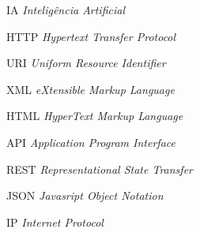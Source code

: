 \begin{siglas}
    \item[IA]{\textit{Inteligência Artificial}}

    \item[HTTP]{\textit{Hypertext Transfer Protocol}}

    \item[URI]{\textit{Uniform Resource Identifier}}

    \item[XML]{\textit{eXtensible Markup Language}}

    \item[HTML]{\textit{HyperText Markup Language}}

    \item[API]{\textit{Application Program Interface}}

    \item[REST]{\textit{Representational State Transfer}}

    \item[JSON]{\textit{Javasript Object Notation}}

    \item[IP]{\textit{Internet Protocol}}
\end{siglas}